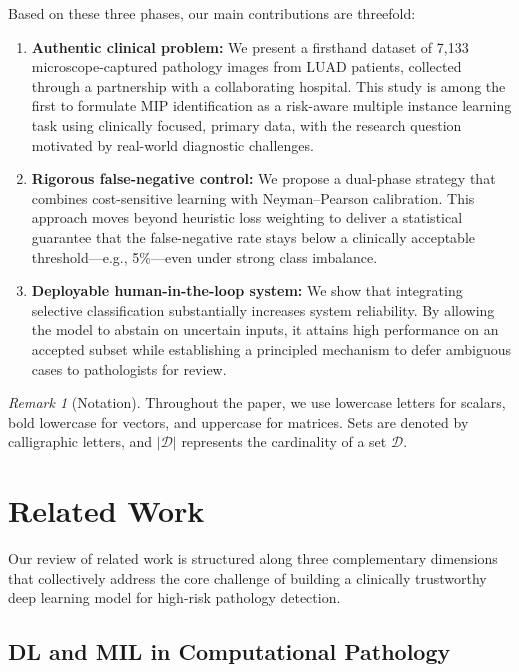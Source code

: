\documentclass[journal]{IEEEtran}
\theoremstyle{remark}
\newtheorem{remark}[theorem]{Remark}
\begin{document}
Based on these three phases, our main contributions are threefold:
\begin{enumerate}
\item \textbf{Authentic clinical problem:} We present a firsthand dataset of 7,133 microscope-captured pathology images from LUAD patients, collected through a partnership with a collaborating hospital. This study is among the first to formulate MIP identification as a risk-aware multiple instance learning task using clinically focused, primary data, with the research question motivated by real-world diagnostic challenges.
\item \textbf{Rigorous false-negative control:} We propose a dual-phase strategy that combines cost-sensitive learning with Neyman–Pearson calibration. This approach moves beyond heuristic loss weighting to deliver a statistical guarantee that the false-negative rate stays below a clinically acceptable threshold—e.g., 5\%—even under strong class imbalance.
\item \textbf{Deployable human-in-the-loop system:} We show that integrating selective classification substantially increases system reliability. By allowing the model to abstain on uncertain inputs, it attains high performance on an accepted subset while establishing a principled mechanism to defer ambiguous cases to pathologists for review.
\end{enumerate}
\begin{remark}[Notation]
Throughout the paper, we use lowercase letters for scalars, bold lowercase for vectors, and uppercase for matrices. Sets are denoted by calligraphic letters, and $|\mathcal{D}|$ represents the cardinality of a set $\mathcal{D}$.
\end{remark}

\section{Related Work}\label{S6-3}

Our review of related work is structured along three complementary dimensions that collectively address the core challenge of building a clinically trustworthy deep learning model for high-risk pathology detection.

\subsection{DL and MIL in Computational Pathology}
\end{document}
